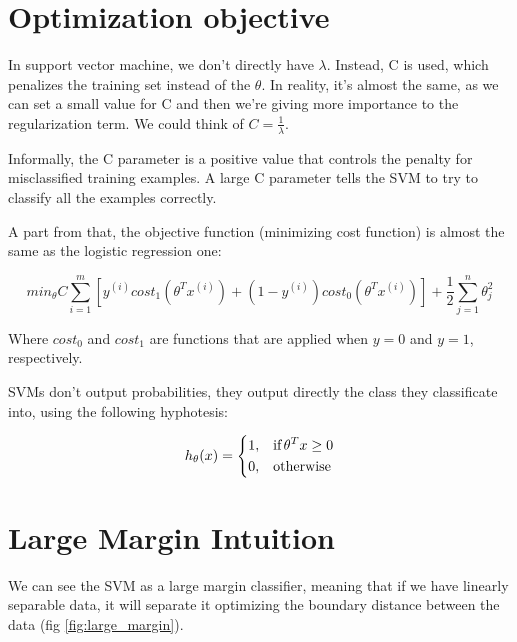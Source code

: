 \section{Optimization objective}\label{optimization-objective}

In support vector machine, we don't directly have $\lambda$. Instead, C
is used, which penalizes the training set instead of the $\theta$. In
reality, it's almost the same, as we can set a small value for C and
then we're giving more importance to the regularization term. We could
think of $C = \frac{1}{\lambda}$.

Informally, the C parameter is a positive value that controls the
penalty for misclassified training examples. A large C parameter tells
the SVM to try to classify all the examples correctly. \smallskip

A part from that, the objective function (minimizing cost function) is
almost the same as the logistic regression one:

\begin{equation} 
min_{\theta} C \sum_{i=1}^m [y^{(i)}cost_1(\theta^T x^{(i)}) + (1 - y^{(i)})cost_0(\theta^T x^{(i)})] + \frac{1}{2} \sum_{j=1}^n \theta_j^2
\end{equation}

Where $cost_0$ and $cost_1$ are functions that are applied when $y = 0$
and $y = 1$, respectively. \smallskip

SVMs don't output probabilities, they output directly the class they
classificate into, using the following hyphotesis:

\begin{equation} 
h_\theta(x) = 
\begin{dcases}
    1, & \text{if\,} \theta^Tx \geq 0 \\ 
    0, & \text{otherwise}
\end{dcases} 
\end{equation}

\section{Large Margin Intuition}\label{large-margin-intuition}

We can see the SVM as a large margin classifier, meaning that if we have
linearly separable data, it will separate it optimizing the boundary
distance between the data (fig \ref{fig:large_margin}).

